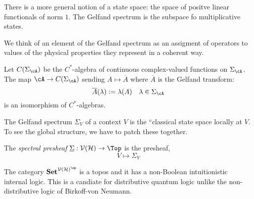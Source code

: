 \documentclass[12pt]{article}
\begin{document}
\begin{rmk}
There is a more general notion of a state space: the space of positve linear functionals of norm $1$. The Gelfand spectrum is the subspace fo multiplicative states. 
\end{rmk}

\begin{rmk}
We think of an element of the Gelfand spectrum as an assigment of operators to values of the physical properties they represent in a coherent way. 
\end{rmk}

\begin{theorem}[Gelfand]
Let $C(\Sigma_{\cA})$ be the $C^*$-algebra of continuous complex-valued functions on $\Sigma_{\cA}$. The map $\cA \to C(\Sigma_{\cA})$ sending $A \mapsto \overline{A}$ where $\overline{A}$ is the Gelfand transform: 
\[ \overline{A}(\lambda) := \lambda(A) \quad \lambda \in \Sigma_{\cA} \]
is an isomorphism of $C^*$-algebras.
\end{theorem}

\begin{rmk}
The Gelfand spectrum $\Sigma_V$ of a context $V$ is the ``classical state space locally at $V$. To see the global structure, we have to patch these together. 
\end{rmk}

\begin{defn}
The \textit{spectral presheaf} $\underline{\Sigma} : \cV(\H) \to \Top$ is the presheaf,
\[ V \mapsto \Sigma_V \] 
\end{defn}

\begin{rmk}
The category $\Set^{\cV(\H)^\op}$ is a topos and it has a non-Boolean intuitionistic internal logic. This is a candiate for distributive quantum logic unlike the non-distributive logic of Birkoff-von Neumann. 
\end{rmk}
\end{document}
